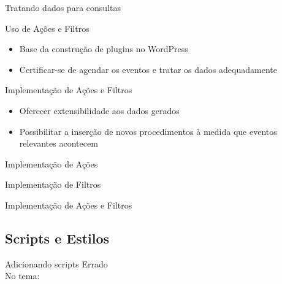 \documentclass{beamer}
\begin{document}
\begin{frame}{Tratando dados para consultas}
  \pause 
\end{frame}

\begin{frame}{Uso de Ações e Filtros}
\begin{itemize}
  \pause \item Base da construção de plugins no WordPress
  \pause \item Certificar-se de agendar os eventos e
    tratar os dados adequadamente
\end{itemize}
\end{frame}

\begin{frame}{Implementação de Ações e Filtros}
\begin{itemize}
  \pause \item Oferecer extensibilidade aos dados gerados
  \pause \item Possibilitar a inserção de novos procedimentos à medida
    que eventos relevantes acontecem
\end{itemize}
\end{frame}

\begin{frame}{Implementação de Ações}
  
  \pause 
\end{frame}

\begin{frame}{Implementação de Filtros}
  
  \pause 
\end{frame}

\begin{frame}{Implementação de Ações e Filtros}
  
\end{frame}

\subsection{Scripts e Estilos}

\begin{frame}{Adicionando scripts}
  \pause Errado \\
  \pause No tema:
  
\end{frame}
\end{document}
